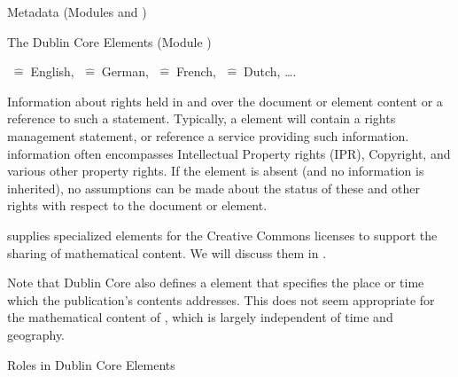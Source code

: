 \begin{tchapter}[id=metadata,short=Metadata]{Metadata (Modules {} and  {})}
\begin{tsection}[id=dc-elements]{The Dublin Core Elements (Module {})}
\begin{description}
  {}$\;\widehat=\;$English, {}$\;\widehat=\;$German,
  {}$\;\widehat=\;$French, {}$\;\widehat=\;$Dutch, \ldots.
\item[{\element[ns-elt=dc]{rights}}] Information about rights held in and over the
  document or element content or a reference to such a statement. Typically, a
  {} element will contain a rights management statement, or
  reference a service providing such information. {}
  information often encompasses Intellectual Property rights (IPR), Copyright, and various
  other property rights. If the {} element is absent (and no
  {} information is inherited), no assumptions can be made
  about the status of these and other rights with respect to the document or element.
  
  {\omdoc} supplies specialized elements for the Creative Commons licenses to support the
  sharing of mathematical content. We will discuss them in {}.
\end{description}
Note that Dublin Core also defines a {} element that
specifies the place or time which the publication's contents addresses. This does
not seem appropriate for the mathematical content of {\omdoc}, which is largely
independent of time and geography.
\end{tsection}

\begin{tsection}[id=dc-roles]{Roles in Dublin Core Elements}


\end{tsection}
\end{tchapter}
